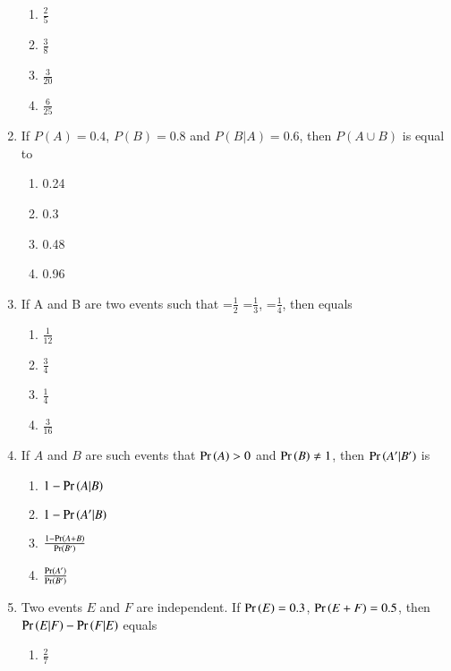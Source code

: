 \begin{enumerate}[label=\thesubsection.\arabic*,ref=\thesubsection.\theenumi]
\begin{enumerate}
\setlength{\itemsep}{1ex}
\item $\frac{2}{5}$
\vspace{3pt}
\item $\frac{3}{8}$
\vspace{3pt}
\item $\frac{3}{20}$
\vspace{3pt}
\item $\frac{6}{25}$
\end{enumerate}
\solution

\item If $P(A)=0.4$, $P(B)=0.8$ and $P(B|A)=0.6$, then $P(A \cup B)$ is equal to
\begin{enumerate}
\item 0.24
\item 0.3
\item 0.48
\item 0.96
\end{enumerate}
\solution

\item If A and B are two events such that  =$\frac{1}{2}$  =$\frac{1}{3}$, =$\frac{1}{4}$, then  equals
\begin{enumerate}
\setlength{\itemsep}{1ex}
	\item $\frac{1}{12}$
	\item $\frac{3}{4}$
	\item $\frac{1}{4}$
	\item $\frac{3}{16}$	
\end{enumerate}
\solution

\item If $A$ and $B$ are such events that $\Pr\left(A\right) > 0$ and $\Pr\left(B\right)\neq 1$, then $\Pr\left(A^\prime|B^\prime\right)$ is
\begin{enumerate}
\setlength{\itemsep}{1ex}
\item $1-\Pr\left(A|B\right)$
\item $1-\Pr\left(A^\prime|B\right)$
\item $\frac{1-\Pr\left(A+B\right)}{\Pr\left(B^\prime\right)}$
\item $\frac{\Pr\left(A^\prime\right)}{\Pr\left(B^\prime\right)}$
\end{enumerate}
\solution

\item  Two events $E$ and $F$ are independent. If $\Pr\left(E\right) = 0.3$, $\Pr\left(E+F\right) = 0.5$, then $\Pr\left(E|F\right)-\Pr\left(F|E\right)$ equals
\begin{enumerate}
\setlength{\itemsep}{1ex}
    \item $\frac{2}{7}$

\end{enumerate}
\end{enumerate}
